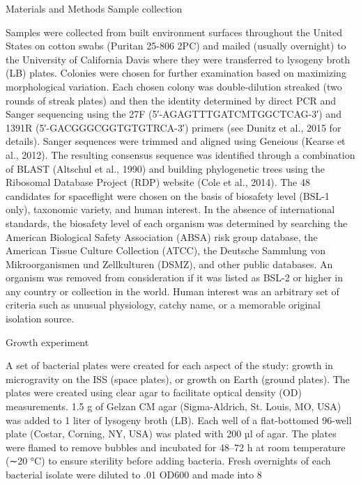 Materials and Methods
Sample collection

Samples were collected from built environment surfaces throughout the United States on cotton swabs (Puritan 25-806 2PC) and mailed (usually overnight) to the University of California Davis where they were transferred to lysogeny broth (LB) plates. Colonies were chosen for further examination based on maximizing morphological variation. Each chosen colony was double-dilution streaked (two rounds of streak plates) and then the identity determined by direct PCR and Sanger sequencing using the 27F (5′-AGAGTTTGATCMTGGCTCAG-3′) and 1391R (5′-GACGGGCGGTGTGTRCA-3′) primers (see Dunitz et al., 2015 for details). Sanger sequences were trimmed and aligned using Geneious (Kearse et al., 2012). The resulting consensus sequence was identified through a combination of BLAST (Altschul et al., 1990) and building phylogenetic trees using the Ribosomal Database Project (RDP) website (Cole et al., 2014). The 48 candidates for spaceflight were chosen on the basis of biosafety level (BSL-1 only), taxonomic variety, and human interest. In the absence of international standards, the biosafety level of each organism was determined by searching the American Biological Safety Association (ABSA) risk group database, the American Tissue Culture Collection (ATCC), the Deutsche Sammlung von Mikroorganismen und Zellkulturen (DSMZ), and other public databases. An organism was removed from consideration if it was listed as BSL-2 or higher in any country or collection in the world. Human interest was an arbitrary set of criteria such as unusual physiology, catchy name, or a memorable original isolation source.

Growth experiment

A set of bacterial plates were created for each aspect of the study: growth in microgravity on the ISS (space plates), or growth on Earth (ground plates). The plates were created using clear agar to facilitate optical density (OD) measurements. 1.5 g of Gelzan CM agar (Sigma-Aldrich, St. Louis, MO, USA) was added to 1 liter of lysogeny broth (LB). Each well of a flat-bottomed 96-well plate (Costar, Corning, NY, USA) was plated with 200 µl of agar. The plates were flamed to remove bubbles and incubated for 48–72 h at room temperature (∼20 °C) to ensure sterility before adding bacteria. Fresh overnights of each bacterial isolate were diluted to .01 OD600 and made into 8%


